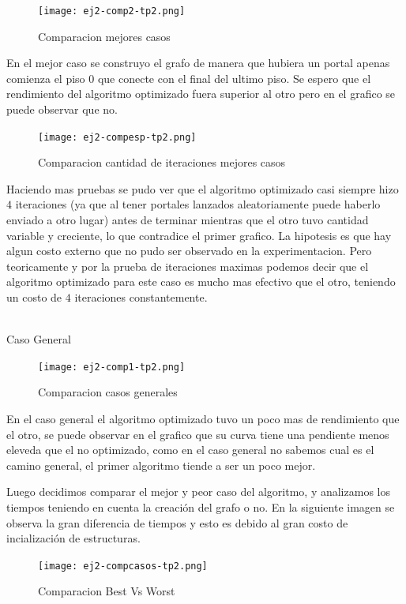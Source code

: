 \begin{figure}[h!]
\texttt{[image: ej2-comp2-tp2.png]}
\centering
\caption{Comparacion mejores casos}
\label{overflow3}
\end{figure}

En el mejor caso se construyo el grafo de manera que hubiera un portal apenas comienza el piso $0$ que conecte con el final del ultimo piso. Se espero que el rendimiento del algoritmo optimizado fuera superior al otro pero en el grafico se puede observar que no. 

\begin{figure}[h!]
\texttt{[image: ej2-compesp-tp2.png]}
\centering
\caption{Comparacion cantidad de iteraciones mejores casos}
\label{overflow3}
\end{figure}

Haciendo mas pruebas se pudo ver que el algoritmo optimizado casi siempre hizo $4$ iteraciones (ya que al tener portales lanzados aleatoriamente puede haberlo enviado a otro lugar) antes de terminar mientras que el otro tuvo cantidad variable y creciente, lo que contradice el primer grafico. La hipotesis es que hay algun costo externo que no pudo ser observado en la experimentacion. Pero teoricamente y por la prueba de iteraciones maximas podemos decir que el algoritmo optimizado para este caso es mucho mas efectivo que el otro, teniendo un costo de $4$ iteraciones constantemente.\\\\

\pagebreak

\begin{centering}
Caso General \\
\end{centering}

\begin{figure}[h!]

\texttt{[image: ej2-comp1-tp2.png]}
\centering
\caption{Comparacion casos generales}
\label{overflow3}
\end{figure}

En el caso general el algoritmo optimizado tuvo un poco mas de rendimiento que el otro, se puede observar en el grafico que su curva tiene una pendiente menos eleveda que el no optimizado, como en el caso general no sabemos cual es el camino general, el primer algoritmo tiende a ser un poco mejor.


\pagebreak
Luego decidimos comparar el mejor y peor caso del algoritmo, y analizamos los tiempos teniendo en cuenta la creaci\'on del grafo o no. En la siguiente imagen se observa la gran diferencia de tiempos y esto es debido al gran costo de incializaci\'on de estructuras.
\begin{figure}[h!]
\texttt{[image: ej2-compcasos-tp2.png]}
\centering
\caption{Comparacion Best Vs Worst}
\label{overflow3}
\end{figure}

\pagebreak

